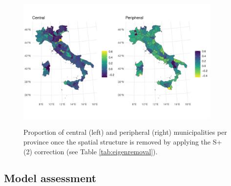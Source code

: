\documentclass[openany]{book}
\begin{document}
\begin{figure}[htbp]
    \centering
    \includegraphics[width=0.9\textwidth]{Invalsi/X_prov_1_nosp_waic.pdf} \\%
    \caption{Proportion of central (left) and peripheral (right) municipalities per province once the spatial structure is removed by applying the S+(2) correction (see Table \ref{tab:eigenremoval}).}
    \label{fig:X_prov_nosp_1}
\end{figure}







\subsection{Model assessment} \label{par:criteria}
\end{document}
